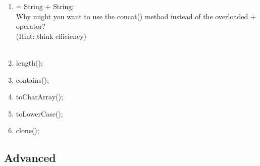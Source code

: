 \documentclass[../../main.tex]{subfiles}
\begin{document}
\begin{steps}
\begin{enumerate}[label=\Alph*.]
      \item \vspace{.5cm}\underline{\hspace{4cm}} = String + String;\\
         Why might you want to use the concat() method instead of the overloaded + operator? \\
         (Hint: think efficiency) \\
         \vspace{.5cm}\\
         \underline{\hspace{15cm}}
      \item \vspace{.5cm}\underline{\hspace{4cm}}length(\underline{\hspace{4cm}});
      \item \vspace{.5cm}\underline{\hspace{4cm}}contains(\underline{\hspace{4cm}});
      \item \vspace{.5cm}\underline{\hspace{4cm}}toCharArray(\underline{\hspace{4cm}});
      \item \vspace{.5cm}\underline{\hspace{4cm}}toLowerCase(\underline{\hspace{4cm}});
      \item \vspace{.5cm}\underline{\hspace{4cm}}clone(\underline{\hspace{4cm}});
   \end{enumerate}
\end{steps}
\pagebreak
\subsection{Advanced}
\end{document}
